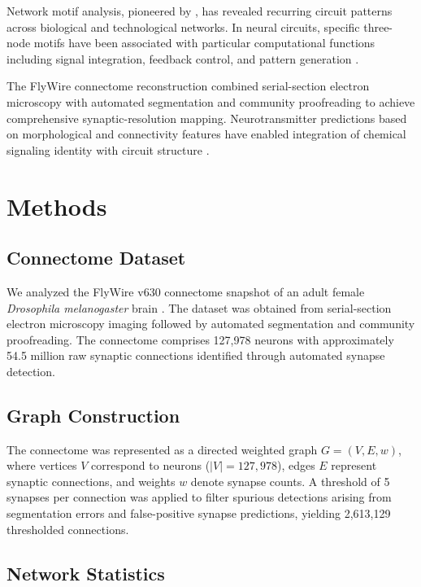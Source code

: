 \documentclass[11pt]{article}
\begin{document}
Network motif analysis, pioneered by \citet{milo2002network}, has revealed recurring circuit patterns across biological and technological networks. In neural circuits, specific three-node motifs have been associated with particular computational functions including signal integration, feedback control, and pattern generation \citep{song2005highly, prill2005dynamic}.

The FlyWire connectome reconstruction \citep{dorkenwald2024neuronal, schlegel2024whole} combined serial-section electron microscopy with automated segmentation and community proofreading to achieve comprehensive synaptic-resolution mapping. Neurotransmitter predictions based on morphological and connectivity features have enabled integration of chemical signaling identity with circuit structure \citep{eckstein2024neurotransmitter}.

\section{Methods}

\subsection{Connectome Dataset}

We analyzed the FlyWire v630 connectome snapshot of an adult female \textit{Drosophila melanogaster} brain \citep{dorkenwald2024neuronal}. The dataset was obtained from serial-section electron microscopy imaging followed by automated segmentation and community proofreading. The connectome comprises 127,978 neurons with approximately 54.5 million raw synaptic connections identified through automated synapse detection.

\subsection{Graph Construction}

The connectome was represented as a directed weighted graph $G = (V, E, w)$, where vertices $V$ correspond to neurons ($|V| = 127{,}978$), edges $E$ represent synaptic connections, and weights $w$ denote synapse counts. A threshold of 5 synapses per connection was applied to filter spurious detections arising from segmentation errors and false-positive synapse predictions, yielding 2,613,129 thresholded connections.

\subsection{Network Statistics}
\end{document}

